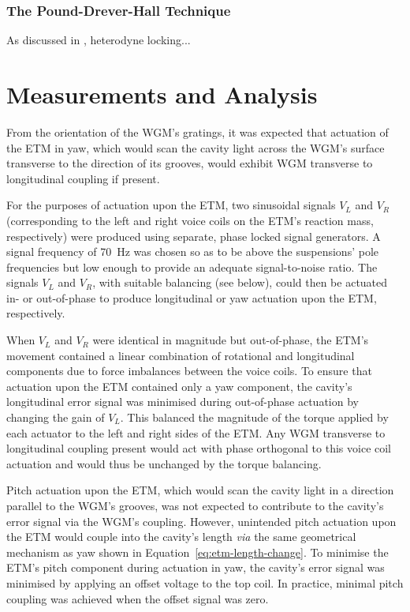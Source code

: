 \subsubsection{The Pound-Drever-Hall Technique}
As discussed in , heterodyne locking...

\section{Measurements and Analysis}
\label{sec:measurements}

From the orientation of the \gls{WGM}'s gratings, it was expected that actuation of the \gls{ETM} in yaw, which would scan the cavity light across the \gls{WGM}'s surface transverse to the direction of its grooves, would exhibit \gls{WGM} transverse to longitudinal coupling if present.

For the purposes of actuation upon the \gls{ETM}, two sinusoidal signals $V_L$ and $V_R$ (corresponding to the left and right voice coils on the \gls{ETM}'s reaction mass, respectively) were produced using separate, phase locked signal generators. A signal frequency of \SI{70}{\hertz} was chosen so as to be above the suspensions' pole frequencies but low enough to provide an adequate signal-to-noise ratio. The signals $V_L$ and $V_R$, with suitable balancing (see below), could then be actuated in- or out-of-phase to produce longitudinal or yaw actuation upon the \gls{ETM}, respectively.

When $V_L$ and $V_R$ were identical in magnitude but out-of-phase, the \gls{ETM}'s movement contained a linear combination of rotational and longitudinal components due to force imbalances between the voice coils. To ensure that actuation upon the \gls{ETM} contained only a yaw component, the cavity's longitudinal error signal was minimised during out-of-phase actuation by changing the gain of $V_L$. This balanced the magnitude of the torque applied by each actuator to the left and right sides of the \gls{ETM}. Any \gls{WGM} transverse to longitudinal coupling present would act with phase orthogonal to this voice coil actuation and would thus be unchanged by the torque balancing.

Pitch actuation upon the \gls{ETM}, which would scan the cavity light in a direction parallel to the \gls{WGM}'s grooves, was not expected to contribute to the cavity's error signal via the \gls{WGM}'s coupling. However, unintended pitch actuation upon the \gls{ETM} would couple into the cavity's length \emph{via} the same geometrical mechanism as yaw shown in Equation~\ref{eq:etm-length-change}. To minimise the \gls{ETM}'s pitch component during actuation in yaw, the cavity's error signal was minimised by applying an offset voltage to the top coil. In practice, minimal pitch coupling was achieved when the offset signal was zero.

